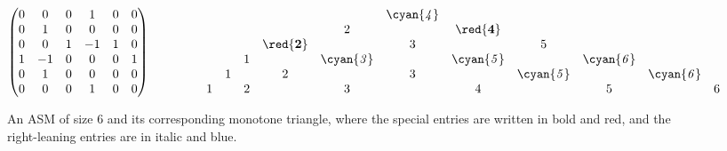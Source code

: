 \begin{figure}
\begin{center}
\[
\begin{pmatrix}
0 & 0 & 0 & 1 & 0 & 0 \\
0 & 1 & 0 & 0 & 0 & 0 \\
0 & 0 & 1 & -1 & 1 & 0 \\
1 & -1 & 0 & 0 & 0 & 1 \\
0 & 1 & 0 & 0 & 0 & 0 \\
0 & 0 & 0 & 1 & 0 & 0
\end{pmatrix}
\qquad \qquad
\begin{array}{c cc cc cc cc cc}
&&&&& \it{\cyan{4}} \\
&&&& 2 && \mathbf{\red{4}}\\
&&&\mathbf{\red{2}} && 3 && 5 \\
&& 1 && \it{\cyan{3}} && \it{\cyan{5}} && \it{\cyan{6}}\\
& 1 && 2 && 3 && \it{\cyan{5}} && \it{\cyan{6}}\\
1 && 2 && 3 && 4 && 5 && 6
\end{array}
\]
\end{center}
\caption{\label{fig: ASM and MT} An ASM of size $6$ and its corresponding monotone triangle, where the special entries are written in bold and red, and the right-leaning entries are in italic and blue.}
\end{figure}

